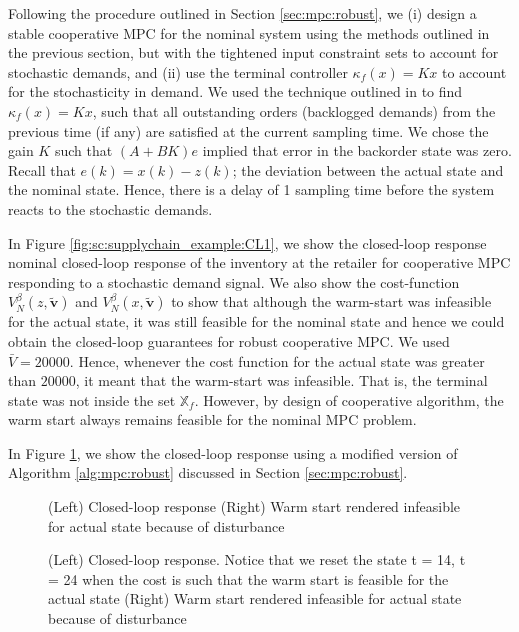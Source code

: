 Following the procedure outlined in Section \ref{sec:mpc:robust}, we
(i) design a stable cooperative MPC for the nominal system using the
methods outlined in the previous section, but with the tightened input
constraint sets to account for stochastic demands, and (ii) use the terminal
controller $\kappa_f(x) = Kx$ to account for the stochasticity in
demand. We used the technique outlined in \citet{rao:rawlings:1999} to find
$\kappa_f(x) = Kx$, such that all outstanding orders (backlogged
demands) from the previous time (if any) are satisfied at the current
sampling time. We chose the gain $K$ such that
$(A+BK)e$ implied that error in the backorder state was zero. Recall
that $e(k) = x(k)-z(k)$; the deviation between the actual state and
the nominal state. Hence, there is a delay
of 1 sampling time before the system reacts to the stochastic
demands. 


In Figure \ref{fig:sc:supplychain_example:CL1}, we show the closed-loop response 
nominal closed-loop response of the  inventory at the retailer for
cooperative MPC responding to a stochastic demand signal.  We also show the cost-function $V^\beta_N(z,\tilde{\mathbf{v}})$ and
$V^\beta_N(x,\tilde{\mathbf{v}})$ to show that although the warm-start was
infeasible for the actual state, it was still feasible for the nominal
state and hence we could obtain the closed-loop guarantees for robust
cooperative MPC. We used $\bar{V} = 20000$. Hence, whenever the cost
function for the actual state was greater than $20000$, it meant that
the warm-start was infeasible. That is, the terminal state was not
inside the set $\mathbb{X}_f$. However, by design of cooperative
algorithm, the warm start always remains feasible for the nominal MPC
problem.

In Figure \ref{fig:sc:supplychain_example:CL2}, we show the closed-loop response using a
modified version of Algorithm \ref{alg:mpc:robust} discussed in Section \ref{sec:mpc:robust}.

\begin{figure}
\centering
\scriptsize
\resizebox{\textwidth}{!}{}
\caption{(Left) Closed-loop response (Right) Warm start rendered
  infeasible for actual state because of disturbance}
\label{fig:sc:supplychain_example:CL1}
\centering
\scriptsize
\resizebox{\textwidth}{!}{}
\caption{(Left) Closed-loop response. Notice that we reset the state
 t = 14, t = 24 when the cost is such that the warm start is
 feasible for the actual state (Right) Warm start rendered
 infeasible for actual state because of disturbance}
\label{fig:sc:supplychain_example:CL2}
\end{figure}


